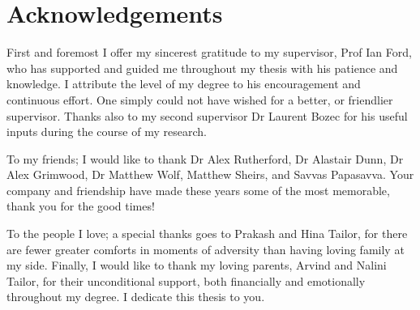 \chapter*{Acknowledgements}

First and foremost I offer my sincerest gratitude to my supervisor, Prof Ian Ford, who has supported and guided me throughout my thesis with his patience and knowledge. I attribute the level of my degree to his encouragement and continuous effort. One simply could not have wished for a better, or friendlier supervisor. Thanks also to my second supervisor Dr Laurent Bozec for his useful inputs during the course of my research.

To my friends; I would like to thank Dr Alex Rutherford, Dr Alastair Dunn, Dr Alex Grimwood, Dr Matthew Wolf, Matthew Sheirs, and Savvas Papasavva.
Your company and friendship have made these years some of the most memorable, thank you for the good times!

To the people I love; a special thanks goes to Prakash and Hina Tailor, for there are fewer greater comforts in moments of adversity than having loving family at my side. Finally, I would like to thank my loving parents, Arvind and Nalini Tailor, for their unconditional support, both financially and emotionally throughout my degree. I dedicate this thesis to you.
 
